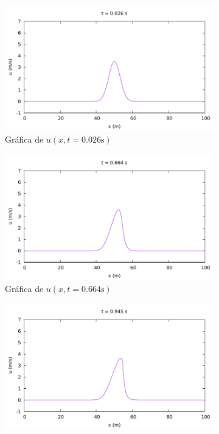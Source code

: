\documentclass[12pt]{article}
\begin{document}
	\begin{figure}[ht]
		\centering
		\begin{subfigure}{0.4\textwidth}
			\centering
			\includegraphics[width=\textwidth]{../burgers1DDF/results/frame001.pdf}
			\caption*{Gráfica de $u(x,t=0.026\unit{\second})$}
			\label{fig:b1ddf1}
		\end{subfigure}\hfill
		\begin{subfigure}{0.4\textwidth}
			\centering
			\includegraphics[width=\textwidth]{../burgers1DDF/results/frame026.pdf}
			\caption*{Gráfica de $u(x,t=0.664\unit{\second})$}
			\label{fig:b1ddf2}
		\end{subfigure}\par
		\begin{subfigure}{0.4\textwidth}
			\centering
			\includegraphics[width=\textwidth]{../burgers1DDF/results/frame037.pdf}

\end{subfigure}
\end{figure}
\end{document}
